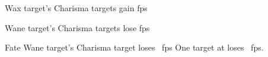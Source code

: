 
  {\mFate}%
  {Wax}%
  {\duplicated}%
  {target's Charisma}%
  {\spellArea{} targets gain  \glspl{fp}}%
  {}

  {\mFate}%
  {Wane}%
  {\duplicated}%
  {target's Charisma}%
  {\spellArea{} targets lose  \glspl{fp}}%
  {}

  {Fate}%
  {Wane}%
  {\distant}%
  {target's Charisma}%
  {target loses \rollConv~\glspl{fp}}%
  {
    One target at \spellRange{} loses \rollConv~\glspl{fp}.
  }

